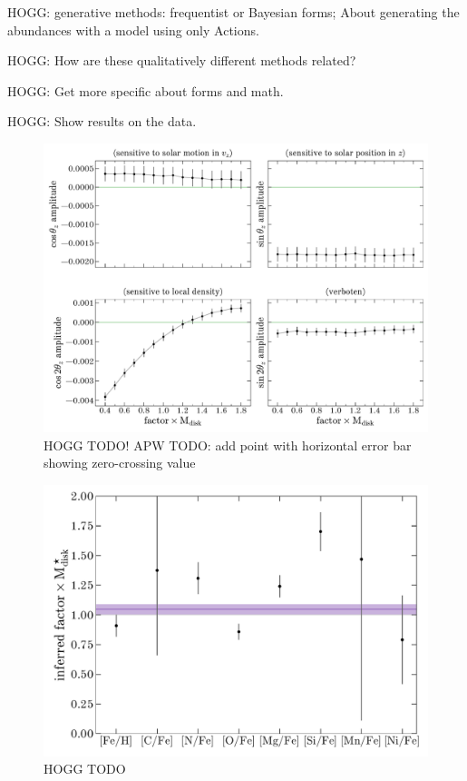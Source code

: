 \documentclass[modern]{aastex63}
\begin{document}
HOGG: generative methods: frequentist or Bayesian forms; About generating the abundances
with a model using only Actions.

HOGG: How are these qualitatively different methods related?

HOGG: Get more specific about forms and math.

HOGG: Show results on the data.

\begin{figure}[!tp]
  \begin{center}
  \includegraphics[width=\textwidth]{coeff-vs-mdisk.pdf}
  \end{center}
  \caption{%
    HOGG TODO!
    APW TODO: add point with horizontal error bar showing zero-crossing value
  \label{fig:coeff-mdisk}
  }
\end{figure}

\begin{figure}[!tp]
  \begin{center}
  \includegraphics[width=\textwidth]{mdisk-vs-elem.pdf}
  \end{center}
  \caption{%
    HOGG TODO
  \label{fig:inferred-mdisk-elems}
  }
\end{figure}
\end{document}
